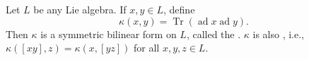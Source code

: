 Let $L$ be any Lie algebra. If $x, y \in L$, define
$$\kappa(x, y) = \operatorname{Tr}(\operatorname{ad} x \operatorname{ad} y).$$
Then $\kappa$ is a symmetric bilinear form on $L$, called the . $\kappa$ is also , i.e., $\kappa([xy], z) = \kappa(x, [yz])$ for all $x, y, z \in L$.
